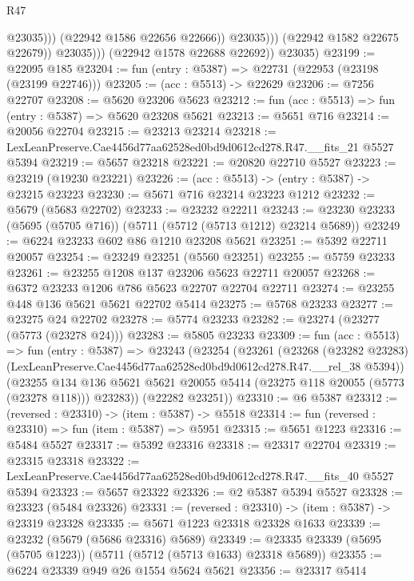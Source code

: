 \begin{lexlean}{R47}
\begin{coremodule}
                              @23035)))
                        (@22942 @1586 @22656 @22666))
                      @23035)))
                (@22942 @1582 @22675 @22679))
              @23035)))
        (@22942 @1578 @22688 @22692))
      @23035)
@23199 := @22095 @185
@23204 := fun (entry : @5387) => @22731 (@22953 (@23198 (@23199 @22746)))
@23205 := (acc : @5513) -> @22629
@23206 := @7256 @22707
@23208 := @5620 @23206 @5623
@23212 := fun (acc : @5513) => fun (entry : @5387) => @5620 @23208 @5621
@23213 := @5651 @716
@23214 := @20056 @22704
@23215 := @23213 @23214
@23218 := LexLeanPreserve.Cae4456d77aa62528ed0bd9d0612cd278.R47.__fits_21 @5527 @5394
@23219 := @5657 @23218
@23221 := @20820 @22710 @5527
@23223 := @23219 (@19230 @23221)
@23226 := (acc : @5513) -> (entry : @5387) -> @23215 @23223
@23230 := @5671 @716 @23214 @23223 @1212
@23232 := @5679 (@5683 @22702)
@23233 := @23232 @22211
@23243 := @23230 @23233 (@5695 (@5705 @716)) (@5711 (@5712 (@5713 @1212) @23214 @5689))
@23249 := @6224 @23233 @602 @86 @1210 @23208 @5621
@23251 := @5392 @22711 @20057
@23254 := @23249 @23251 (@5560 @23251)
@23255 := @5759 @23233
@23261 := @23255 @1208 @137 @23206 @5623 @22711 @20057
@23268 := @6372 @23233 @1206 @786 @5623 @22707 @22704 @22711
@23274 := @23255 @448 @136 @5621 @5621 @22702 @5414
@23275 := @5768 @23233
@23277 := @23275 @24 @22702
@23278 := @5774 @23233
@23282 := @23274 (@23277 (@5773 (@23278 @24)))
@23283 := @5805 @23233
@23309 := fun (acc : @5513) =>
  fun (entry : @5387) =>
  @23243
    (@23254
      (@23261
        (@23268
          (@23282 @23283)
          (LexLeanPreserve.Cae4456d77aa62528ed0bd9d0612cd278.R47.__rel_38 @5394))
        (@23255
          @134
          @136
          @5621
          @5621
          @20055
          @5414
          (@23275 @118 @20055 (@5773 (@23278 @118)))
          @23283))
      (@22282 @23251))
@23310 := @6 @5387
@23312 := (reversed : @23310) -> (item : @5387) -> @5518
@23314 := fun (reversed : @23310) => fun (item : @5387) => @5951
@23315 := @5651 @1223
@23316 := @5484 @5527
@23317 := @5392 @23316
@23318 := @23317 @22704
@23319 := @23315 @23318
@23322 := LexLeanPreserve.Cae4456d77aa62528ed0bd9d0612cd278.R47.__fits_40 @5527 @5394
@23323 := @5657 @23322
@23326 := @2 @5387 @5394 @5527
@23328 := @23323 (@5484 @23326)
@23331 := (reversed : @23310) -> (item : @5387) -> @23319 @23328
@23335 := @5671 @1223 @23318 @23328 @1633
@23339 := @23232 (@5679 (@5686 @23316) @5689)
@23349 := @23335 @23339 (@5695 (@5705 @1223)) (@5711 (@5712 (@5713 @1633) @23318 @5689))
@23355 := @6224 @23339 @949 @26 @1554 @5624 @5621
@23356 := @23317 @5414

\end{coremodule}
\end{lexlean}
